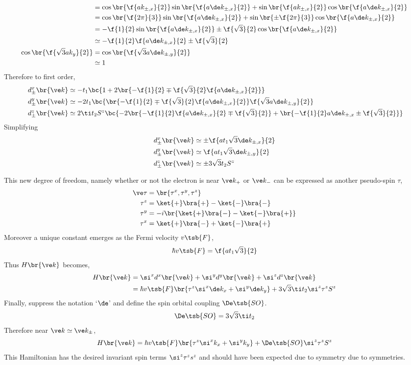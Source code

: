 \documentclass{article}
\begin{document}
\begin{align*}
    &= \cos \br{\f{ak_{\pm,x}}{2}}\sin \br{\f{a\de k_{\pm,x}}{2}} + \sin \br{\f{ak_{\pm,x}}{2}}\cos \br{\f{a\de k_{\pm,x}}{2}} \\
    &= \cos \br{\f{2 \pi}{3}}\sin \br{\f{a\de k_{\pm,x}}{2}} + \sin \br{\pm \f{2 \pi}{3}}\cos \br{\f{a\de k_{\pm,x}}{2}} \\
    &= -\f{1}{2}\sin \br{\f{a\de k_{\pm,x}}{2}} \pm \f{\sqrt{3}}{2}\cos \br{\f{a\de k_{\pm,x}}{2}} \\
    &\simeq -\f{1}{2}\f{a\de k_{\pm,x}}{2} \pm \f{\sqrt{3}}{2} \\
    \cos \br{\f{\sqrt{3}ak_y}{2}}
    &= \cos \br{\f{\sqrt{3}a\de k_{\pm,y}}{2}} \\
    &\simeq 1
\end{align*}
Therefore to first order,
\begin{align*}
    d_{\pm}^{x}\br{\ve k} &\simeq -t_1\bc{1 + 2\br{-\f{1}{2} \mp \f{\sqrt{3}}{2}\f{a\de k_{\pm,x}}{2}}} \\
    d_{\pm}^{y}\br{\ve k} &\simeq -2t_1\bc{\br{-\f{1}{2} \mp \f{\sqrt{3}}{2}\f{a\de k_{\pm,x}}{2}}\f{\sqrt{3}a\de k_{\pm, y}}{2}}\\\
    d_{\pm}^{z}\br{\ve k} &\simeq 2\ti t_2S^{z}\bc{-2 \br{-\f{1}{2}\f{a\de k_{\pm,x}}{2} \mp \f{\sqrt{3}}{2}} + \br{-\f{1}{2}a\de k_{\pm,x} \pm \f{\sqrt{3}}{2}}}
\end{align*}
Simplifying
\begin{align*}
    d_{\pm}^{x}\br{\ve k} &\simeq \pm \f{at_1 \sqrt{3}\de k_{\pm,x}}{2} \\
    d_{\pm}^{y}\br{\ve k} &\simeq \f{at_1 \sqrt{3}\de k_{\pm,y}}{2}\\
    d_{\pm}^{z}\br{\ve k} &\simeq \pm 3\sqrt{3}t_2S^{z}
\end{align*}

This new degree of freedom, namely whether or not the electron is near $\ve k_{+}$ or $\ve k_{-}$ can be expressed as another pseudo-spin $\tau$,
\begin{align*}
    \ve \tau &= \br{\tau^{x}, \tau^{y}, \tau^{z}} \\
    \tau^{z} &= \ket{+} \bra{+} - \ket{-}\bra{-} \\
    \tau^{y} &= -i\br{\ket{+} \bra{-} - \ket{-}\bra{+}} \\
    \tau^{x} &= \ket{+} \bra{-} + \ket{-}\bra{+}
\end{align*}
Moreover a unique constant emerges as the Fermi velocity $v\tsb{F}$,
\[ \hbar v\tsb{F} = \f{at_1 \sqrt{3}}{2}\]
Thus $H\br{\ve k}$ becomes,
\begin{align*}
H\br{\ve k}
&= \si^{x}d^{x}\br{\ve k} + \si^{y}d^{y}\br{\ve k} + \si^{z}d^{z}\br{\ve k} \\
&= \hbar v\tsb{F}\br{\tau^{z}\si^{x}\de k_{x} + \si^{y} \de k_{y}} + 3\sqrt{3} \ti t_2 \si^{z} \tau^{z} S^{z}
\end{align*}
Finally, suppress the notation `$\de$' and define the spin orbital coupling $\De\tsb{SO}$.
\[ \De\tsb{SO} = 3 \sqrt{3} \ti t_2 \]
Therefore near $\ve k \simeq \ve k_{\pm}$,
\[ H\br{\ve k} = \hbar v\tsb{F}\br{\tau^{z}\si^{x}k_{x} + \si^{y} k_{y}} + \De\tsb{SO} \si^{z} \tau^{z} S^{z} \]
This Hamiltonian has the desired invariant spin terms $\si^{z} \tau^{z} s^{z}$ and should have been expected due to symmetry due to symmetries.
\end{document}
